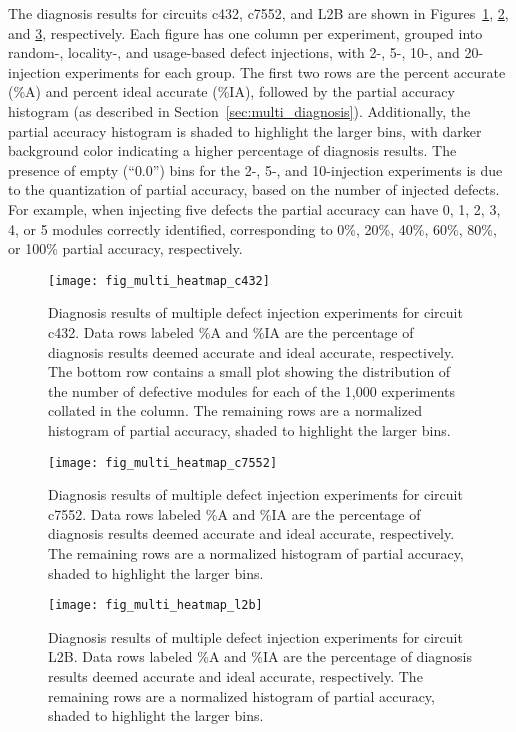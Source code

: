 The diagnosis results for circuits c432, c7552, and L2B are shown in Figures~\ref{fig:multi_heatmap_c432}, \ref{fig:multi_heatmap_c7552}, and \ref{fig:multi_heatmap_l2b}, respectively.
%
Each figure has one column per experiment, grouped into random-, locality-, and usage-based defect injections, with 2-, 5-, 10-, and 20-injection experiments for each group.
%
The first two rows are the percent accurate (\%A) and percent ideal accurate (\%IA), followed by the partial accuracy histogram (as described in Section~\ref{sec:multi_diagnosis}).
%
Additionally, the partial accuracy histogram is shaded to highlight the larger bins, with darker background color indicating a higher percentage of diagnosis results.
%
The presence of empty (``$0.0$'') bins for the 2-, 5-, and 10-injection experiments is due to the quantization of partial accuracy, based on the number of injected defects.
%
For example, when injecting five defects the partial accuracy can have 0, 1, 2, 3, 4, or 5 modules correctly identified, corresponding to 0\%, 20\%, 40\%, 60\%, 80\%, or 100\% partial accuracy, respectively.

\begin{figure}[hbtp]
\centering
\texttt{[image: fig\_multi\_heatmap\_c432]}
\caption{Diagnosis results of multiple defect injection experiments for circuit c432.
%
Data rows labeled \%A and \%IA are the percentage of diagnosis results deemed accurate and ideal accurate, respectively.
%
The bottom row contains a small plot showing the distribution of the number of defective modules for each of the 1,000 experiments collated in the column.
%
The remaining rows are a normalized histogram of partial accuracy, shaded to highlight the larger bins.}
\label{fig:multi_heatmap_c432}
\end{figure}

\begin{figure}[hbtp]
\centering
\texttt{[image: fig\_multi\_heatmap\_c7552]}
\caption{Diagnosis results of multiple defect injection experiments for circuit c7552.
%
Data rows labeled \%A and \%IA are the percentage of diagnosis results deemed accurate and ideal accurate, respectively.
%
The remaining rows are a normalized histogram of partial accuracy, shaded to highlight the larger bins.}
\label{fig:multi_heatmap_c7552}
\end{figure}

\begin{figure}[hbtp]
\centering
\texttt{[image: fig\_multi\_heatmap\_l2b]}
\caption{Diagnosis results of multiple defect injection experiments for circuit L2B.
%
Data rows labeled \%A and \%IA are the percentage of diagnosis results deemed accurate and ideal accurate, respectively.
%
The remaining rows are a normalized histogram of partial accuracy, shaded to highlight the larger bins.}
\label{fig:multi_heatmap_l2b}
\end{figure}

